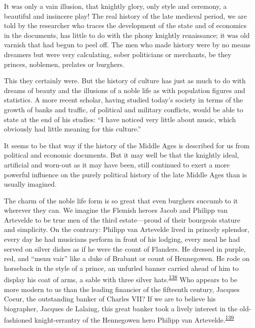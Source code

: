 It was only a vain illusion, that knightly glory, only style and
ceremony, a beautiful and insincere play! The real history of the late
medieval period, we are told by the researcher who traces the
development of the state and of economics in the documents, has little
to do with the phony knightly renaissance; it was old varnish that had
begun to peel off. The men who made history were by no means dreamers
but were very calculating, sober politicians or merchants, be they
princes, noblemen, prelates or burghers.

This they certainly were. But the history of culture has just as much to
do with dreams of beauty and the illusions of a noble life as with
population figures and statistics. A more recent scholar, having studied
today's society in terms of the growth of banks and traffic, of
political and military conflicts, would be able to state at the end of
his studies: ``I have noticed very little about music, which obviously
had little meaning for this culture.''

It seems to be that way if the history of the Middle Ages is described
for us from political and economic documents. But it may well be that
the knightly ideal, artificial and worn-out as it
\protect\hypertarget{10_Chapter_Three__THE_HEROIC_DREAM.xhtmlux5cux23page_104}{}{}may
have been, still continued to exert a more powerful influence on the
purely political history of the late Middle Ages than is usually
imagined.

The charm of the noble life form is so great that even burghers succumb
to it wherever they can. We imagine the Flemish heroes Jacob and Philipp
van Artevelde to be true men of the third estate---proud of their
bourgeois stature and simplicity. On the contrary: Philipp van Artevelde
lived in princely splendor, every day he had musicians perform in front
of his lodging, every meal he had served on silver dishes as if he were
the count of Flanders. He dressed in purple, red, and ``menu vair'' like
a duke of Brabant or count of Hennegowen. He rode on horseback in the
style of a prince, an unfurled banner carried ahead of him to display
his coat of arms, a sable with three silver
hats.\textsuperscript{\protect\hypertarget{10_Chapter_Three__THE_HEROIC_DREAM.xhtmlux5cux23id_1659}{\protect\hyperlink{23_NOTES.xhtmlux5cux23id_1660}{138}}}
Who appears to be more modern to us than the leading financier of the
fifteenth century, Jacques Coeur, the outstanding banker of Charles VII?
If we are to believe his biographer, Jacques de Lalaing, this great
banker took a lively interest in the old-fashioned knight-errantry of
the Hennegowen hero Philipp van
Artevelde.\textsuperscript{\protect\hypertarget{10_Chapter_Three__THE_HEROIC_DREAM.xhtmlux5cux23id_1657}{\protect\hyperlink{23_NOTES.xhtmlux5cux23id_1658}{139}}}

